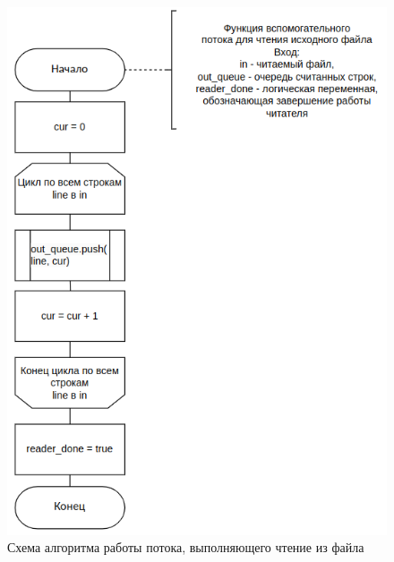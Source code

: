 \clearpage

\begin{figure}[h]
	\centering
	\includegraphics[height=0.8\textheight]{img/thread_reader.png}
	\caption{Схема алгоритма работы потока, выполняющего чтение из файла}
	\label{fig:thread_reader}
\end{figure}

\clearpage


